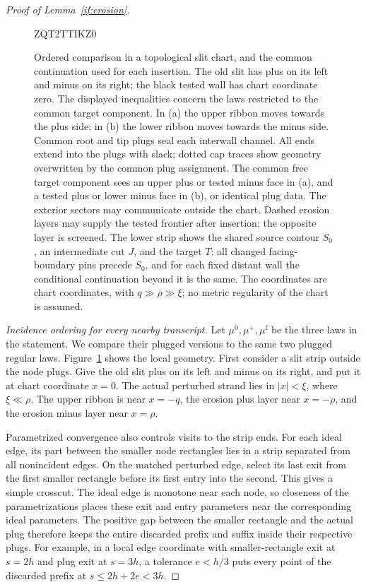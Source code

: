 \documentclass[11pt]{article}
\theoremstyle{definition}
\theoremstyle{remark}
\numberwithin{equation}{section}
\begin{document}
\begin{proof}[Proof of Lemma~\ref{if:erosion}]
\begin{figure}[!htbp]

\begingroup
{}

ZQT2TTIKZ0
\endgroup

\caption{Ordered comparison in a topological slit chart, and the common
continuation used for each insertion. The old slit has plus on its left
and minus on its right; the black tested wall has chart coordinate zero.
The displayed inequalities concern the laws restricted to the common
target component. In (a) the upper ribbon moves towards the plus
side; in (b) the lower ribbon moves towards the minus side. Common root
and tip plugs seal each interwall channel. All ends extend into the
plugs with slack; dotted cap traces show geometry overwritten by the
common plug assignment. The common free target component sees an upper
plus or tested minus face in (a), and a tested plus or lower minus face
in (b), or identical plug data. The exterior sectors may communicate
outside the chart. Dashed erosion layers may supply the tested frontier
after insertion; the opposite layer is screened. The lower strip shows
the shared source contour $S_0$, an intermediate cut $J$, and the target
$T$: all changed facing-boundary pins precede $S_0$, and for each fixed
distant wall the conditional continuation beyond it is the same. The
coordinates are chart coordinates, with $q\gg\rho\gg\xi$; no metric
regularity of the chart is assumed.}
\label{if:slit-figure}
\end{figure}

\emph{Incidence ordering for every nearby transcript.}
Let $\mu^0,\mu^+,\mu^{\mathrm f}$ be the three laws in the statement.
We compare their plugged versions to the same two plugged regular
laws. Figure~\ref{if:slit-figure} shows the local geometry. First
consider a slit strip outside the node plugs. Give the old slit plus
on its left and minus on its right, and put it at chart coordinate
$x=0$. The actual perturbed strand lies in $|x|<\xi$, where
$\xi\ll\rho$. The upper ribbon is near $x=-q$, the erosion plus
layer near $x=-\rho$, and the erosion minus layer near $x=\rho$.

Parametrized convergence also controls visits to the strip ends.
For each ideal edge, its part between the smaller node rectangles
lies in a strip separated from all nonincident edges. On the matched
perturbed edge, select its last exit from the first smaller rectangle
before its first entry into the second. This gives a simple crosscut.
The ideal edge is monotone near each node, so closeness of the
parametrizations places these exit and entry parameters near the
corresponding ideal parameters. The positive gap between the smaller
rectangle and the actual plug therefore keeps the entire discarded
prefix and suffix inside their respective plugs. For example, in a
local edge coordinate with smaller-rectangle exit at $s=2h$ and plug
exit at $s=3h$, a tolerance $e<h/3$ puts every point of the discarded
prefix at $s\le2h+2e<3h$.


\end{proof}
\end{document}

